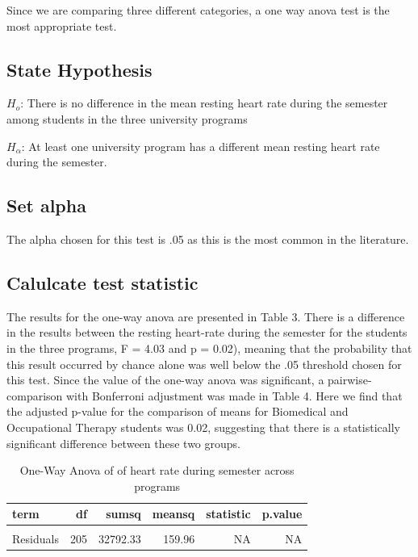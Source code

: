 \documentclass[preprint, 3p,
authoryear]{elsarticle} %
\begin{document}
Since we are comparing three different categories, a one way anova test
is the most appropriate test.

\hypertarget{state-hypothesis}{%
\subsection{State Hypothesis}\label{state-hypothesis}}

\(H_o\): There is no difference in the mean resting heart rate during
the semester among students in the three university programs

\(H_\alpha\): At least one university program has a different mean
resting heart rate during the semester.

\hypertarget{set-alpha}{%
\subsection{Set alpha}\label{set-alpha}}

The alpha chosen for this test is .05 as this is the most common in the
literature.

\hypertarget{calulcate-test-statistic}{%
\subsection{Calulcate test statistic}\label{calulcate-test-statistic}}

The results for the one-way anova are presented in Table 3. There is a
difference in the results between the resting heart-rate during the
semester for the students in the three programs, F = 4.03 and p = 0.02),
meaning that the probability that this result occurred by chance alone
was well below the .05 threshold chosen for this test. Since the value
of the one-way anova was significant, a pairwise-comparison with
Bonferroni adjustment was made in Table 4. Here we find that the
adjusted p-value for the comparison of means for Biomedical and
Occupational Therapy students was 0.02, suggesting that there is a
statistically significant difference between these two groups.

\begin{table}

\caption{\label{tab:unnamed-chunk-5}One-Way Anova of of heart rate during semester across programs}
\centering
\fontsize{7}{9}\selectfont
\begin{tabular}[t]{l|r|r|r|r|r}
\hline
\textbf{term} & \textbf{df} & \textbf{sumsq} & \textbf{meansq} & \textbf{statistic} & \textbf{p.value}\\
\hline
\cellcolor{gray!6}{Program} & \cellcolor{gray!6}{2} & \cellcolor{gray!6}{1289.86} & \cellcolor{gray!6}{644.93} & \cellcolor{gray!6}{4.03} & \cellcolor{gray!6}{0.02}\\
\hline
Residuals & 205 & 32792.33 & 159.96 & NA & NA\\
\hline
\end{tabular}
\end{table}
\end{document}
